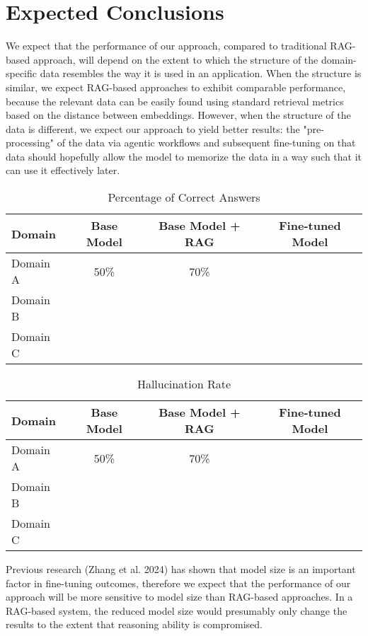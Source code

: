 \section{Expected Conclusions}

We expect that the performance of our approach, compared to traditional RAG-based approach, will depend on the extent to which the structure of the domain-specific data resembles the way it is used in an application. When the structure is similar, we expect RAG-based approaches to exhibit comparable performance, because the relevant data can be easily found using standard retrieval metrics based on the distance between embeddings. However, when the structure of the data is different, we expect our approach to yield better results: the "pre-processing" of the data via agentic workflows and subsequent fine-tuning on that data should hopefully allow the model to memorize the data in a way such that it can use it effectively later.


\begin{table}[ht]
    \centering
    \begin{tabular}{|l|c|c|c|}
        \hline
        Domain & Base Model & Base Model + RAG & Fine-tuned Model \\ \hline
        Domain A & 50\% & 70\% &  \\ \hline
        Domain B & & &  \\ \hline
        Domain C & & &  \\ \hline
    \end{tabular}
    \caption{Percentage of Correct Answers}
\end{table}

\begin{table}[ht]
    \centering
    \begin{tabular}{|l|c|c|c|}
        \hline
        Domain & Base Model & Base Model + RAG & Fine-tuned Model \\ \hline
        Domain A & 50\% & 70\% &  \\ \hline
        Domain B & & &  \\ \hline
        Domain C & & &  \\ \hline
    \end{tabular}
    \caption{Hallucination Rate}
\end{table}

Previous research (Zhang et al. 2024) has shown that model size is an important factor in fine-tuning outcomes, therefore we expect that the performance of our approach will be more sensitive to model size than RAG-based approaches. In a RAG-based system, the reduced model size would presumably only change the results to the extent that reasoning ability is compromised.
